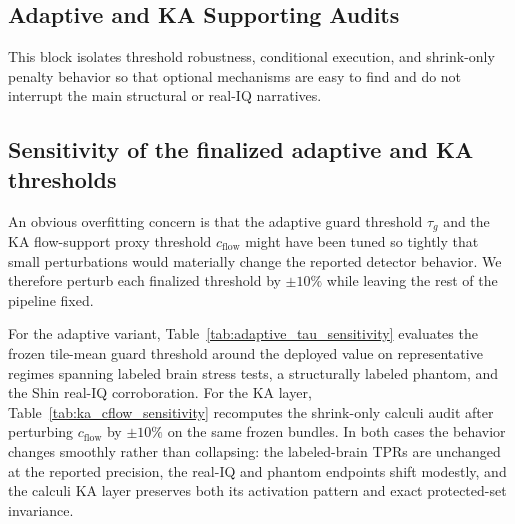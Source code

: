 \subsection*{Adaptive and KA Supporting Audits}
This block isolates threshold robustness, conditional execution, and shrink-only penalty behavior so that optional mechanisms are easy to find and do not interrupt the main structural or real-IQ narratives.

\subsection{Sensitivity of the finalized adaptive and KA thresholds}
\label{app:param-threshold-sensitivity}
An obvious overfitting concern is that the adaptive guard threshold $\tau_g$ and the KA flow-support proxy threshold $c_{\mathrm{flow}}$ might have been tuned so tightly that small perturbations would materially change the reported detector behavior. We therefore perturb each finalized threshold by $\pm 10\%$ while leaving the rest of the pipeline fixed.

For the adaptive variant, Table~\ref{tab:adaptive_tau_sensitivity} evaluates the frozen tile-mean guard threshold around the deployed value on representative regimes spanning labeled brain stress tests, a structurally labeled phantom, and the Shin real-IQ corroboration. For the KA layer, Table~\ref{tab:ka_cflow_sensitivity} recomputes the shrink-only calculi audit after perturbing $c_{\mathrm{flow}}$ by $\pm 10\%$ on the same frozen bundles. In both cases the behavior changes smoothly rather than collapsing: the labeled-brain TPRs are unchanged at the reported precision, the real-IQ and phantom endpoints shift modestly, and the calculi KA layer preserves both its activation pattern and exact protected-set invariance.




